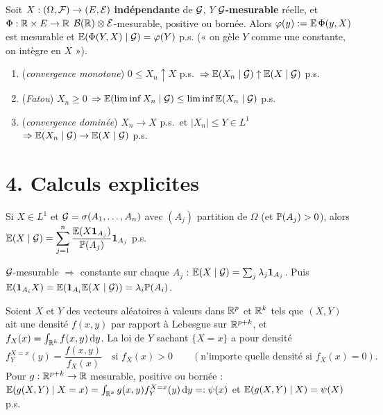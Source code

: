 \documentclass[11pt,a4paper]{article}
\begin{document}
\begin{proposition}\label{C6:gel}
Soit $X:(\Omega,\mathcal{F})\to(E,\mathcal{E})$ \textbf{indépendante} de $\mathcal{G}$, $Y$ \textbf{$\mathcal{G}$-mesurable} réelle, et $\Phi:\mathbb{R}\times E\to\mathbb{R}$
$\mathcal{B}(\mathbb{R})\otimes\mathcal{E}$-mesurable, positive ou bornée. Alors $\varphi(y):=\mathbb{E}\,\Phi(y,X)$ est mesurable et
$\mathbb{E}(\Phi(Y,X)\mid\mathcal{G})=\varphi(Y)$ p.s. (« on gèle $Y$ comme une constante, on intègre en $X$ »).
\end{proposition}

\begin{proposition}\label{C6:conv}\leavevmode
\begin{enumerate}
  \item (\emph{convergence monotone}) $0\le X_n\uparrow X$ p.s.\ $\Rightarrow\mathbb{E}(X_n\mid\mathcal{G})\uparrow\mathbb{E}(X\mid\mathcal{G})$ p.s.
  \item (\emph{Fatou}) $X_n\ge0$ $\Rightarrow\mathbb{E}(\liminf X_n\mid\mathcal{G})\le\liminf\mathbb{E}(X_n\mid\mathcal{G})$ p.s.
  \item (\emph{convergence dominée}) $X_n\to X$ p.s.\ et $|X_n|\le Y\in L^1$ $\Rightarrow\mathbb{E}(X_n\mid\mathcal{G})\to\mathbb{E}(X\mid\mathcal{G})$ p.s.
\end{enumerate}
\end{proposition}

\section*{4. Calculs explicites}

\begin{theoreme}\label{C6:partition}
Si $X\in L^1$ et $\mathcal{G}=\sigma(A_1,\dots,A_n)$ avec $(A_j)$ partition de $\Omega$ (et $\mathbb{P}(A_j)>0$), alors
$\displaystyle\mathbb{E}(X\mid\mathcal{G})=\sum_{j=1}^n\frac{\mathbb{E}(X\mathbf{1}_{A_j})}{\mathbb{P}(A_j)}\mathbf{1}_{A_j}$ p.s.
\end{theoreme}
\begin{idee}
$\mathcal{G}$-mesurable $\Rightarrow$ constante sur chaque $A_j$ : $\mathbb{E}(X\mid\mathcal{G})=\sum_j\lambda_j\mathbf{1}_{A_j}$. Puis
$\mathbb{E}(\mathbf{1}_{A_i}X)=\mathbb{E}(\mathbf{1}_{A_i}\mathbb{E}(X\mid\mathcal{G}))=\lambda_i\mathbb{P}(A_i)$.
\end{idee}

\begin{theoreme}\label{C6:densite}
Soient $X$ et $Y$ des vecteurs aléatoires à valeurs dans $\mathbb{R}^p$ et $\mathbb{R}^k$ tels que $(X,Y)$ ait une densité $f(x,y)$ par rapport à Lebesgue sur $\mathbb{R}^{p+k}$, et
$f_X(x)=\int_{\mathbb{R}^k}f(x,y)\,\mathrm{d} y$. La loi de $Y$ sachant $\{X=x\}$ a pour densité
\[f_Y^{X=x}(y)=\frac{f(x,y)}{f_X(x)}\quad\text{si }f_X(x)>0\qquad(\text{n'importe quelle densité si }f_X(x)=0).\]
Pour $g:\mathbb{R}^{p+k}\to\mathbb{R}$ mesurable, positive ou bornée : $\mathbb{E}(g(X,Y)\mid X=x)=\int_{\mathbb{R}^k}g(x,y)f_Y^{X=x}(y)\,\mathrm{d} y=:\psi(x)$ et
$\mathbb{E}(g(X,Y)\mid X)=\psi(X)$ p.s.
\end{theoreme}
\end{document}
